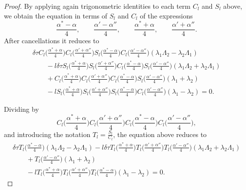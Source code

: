 \documentclass[10pt,a4paper]{amsart}
\numberwithin{equation}{section}
\begin{document}
\begin{proof}
 By applying again trigonometric identities
 to each term $C_l$ and $S_l$ above, we obtain the equation in terms of $S_l$ and $C_l$ of the expressions
\[
\frac{\alpha^*-\alpha}{4}, \qquad
\frac{\alpha'-\alpha''}{4},
\qquad
\frac{\alpha^*+\alpha}{4}, \qquad
\frac{\alpha'+\alpha''}{4}.
\]
After cancellations it reduces to
\begin{gather*}
\delta\tau C_l\biggl(\frac{\alpha^*+\alpha}{4}\biggr) C_l\biggl(\frac{\alpha'+\alpha''}{4}\biggr)
S_l\biggl(\frac{\alpha^*-\alpha}{4}\biggr)C_l\biggl(\frac{\alpha'-\alpha''}{4}\biggr)(\lambda_1\Lambda_2-\lambda_2\Lambda_1)\\
\qquad{} -l \delta\tau S_l\biggl(\frac{\alpha^*+\alpha}{4}\biggr) S_l\biggl(\frac{\alpha'+\alpha''}{4}\biggr)
C_l\biggl(\frac{\alpha^*-\alpha}{4}\biggr)S_l\biggl(\frac{\alpha'-\alpha''}{4}\biggr)(\lambda_1\Lambda_2+\lambda_2\Lambda_1)\\
\qquad{} + C_l\biggl(\frac{\alpha^*+\alpha}{4}\biggr) C_l\biggl(\frac{\alpha'+\alpha''}{4}\biggr)
C_l\biggl(\frac{\alpha^*-\alpha}{4}\biggr)S_l\biggl(\frac{\alpha'-\alpha''}{4}\biggr) (\lambda_1+\lambda_2)\\
\qquad{} -lS_l\biggl(\frac{\alpha^*+\alpha}{4}\biggr) S_l\biggl(\frac{\alpha'+\alpha''}{4}\biggr)
S_l\biggl(\frac{\alpha^*-\alpha}{4}\biggr)C_l\biggl(\frac{\alpha'-\alpha''}{4}\biggr) (\lambda_1-\lambda_2)=0.
\end{gather*}

Dividing by
\[
C_l\biggl(\frac{\alpha^*+\alpha}{4}\biggr) C_l\biggl(\frac{\alpha'+\alpha''}{4}\biggr)C_l\biggl(\frac{\alpha^*-\alpha}{4}\biggr)C_l\biggl(\frac{\alpha'-\alpha''}{4}\biggr),
\]
and introducing the notation $T_l=\displaystyle \frac{S_l}{C_l}$, the equation above reduces to
\begin{gather}
 \delta\tau T_l\biggl(\frac{\alpha^*-\alpha}{4}\biggr)(\lambda_1\Lambda_2-\lambda_2\Lambda_1)
 -l\delta\tau T_l\biggl(\frac{\alpha^*+\alpha}{4}\biggr)T_l\biggl( \frac{\alpha'+\alpha''}{4}\biggr)
T_l\biggl(\frac{\alpha'-\alpha''}{4}\biggr) (\lambda_1\Lambda_2+\lambda_2\Lambda_1) \nonumber\\
\qquad{} +T_l\biggl(\frac{\alpha'-\alpha''}{4}\biggr)(\lambda_1+\lambda_2) \nonumber\\
\qquad{} - lT_l\biggl(\frac{\alpha^*+\alpha}{4} \biggr)T_l\biggl(\frac{\alpha'+\alpha''}{4}\biggr)T_l\biggl(\frac{\alpha^*-\alpha}{4}\biggr)(\lambda_1-\lambda_2)=0.\label{Tl}
\end{gather}


\end{proof}
\end{document}
